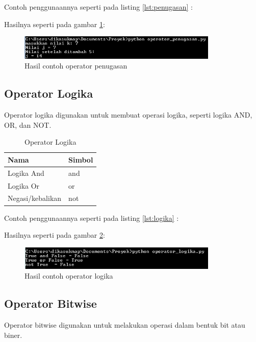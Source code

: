Contoh penggunaannya seperti pada listing \ref{lst:penugasan} :


Hasilnya seperti pada gambar \ref{fig:penugasan}:
\begin{figure}[!htbp]
	\centerline{\includegraphics[width=0.85\textwidth]{figures/2/penugasan.PNG}}
	\caption{Hasil contoh operator penugasan}
	\label{fig:penugasan}
\end{figure}

\subsection{Operator Logika}
Operator logika digunakan untuk membuat operasi logika, seperti logika AND, OR, dan NOT.

\begin{table}[]
\caption{Operator Logika}
\label{tab:my-table}
\begin{tabular}{|l|l|}
\hline
Nama             & Simbol \\ \hline
Logika And       & and    \\ \hline
Logika Or        & or     \\ \hline
Negasi/kebalikan & not    \\ \hline
\end{tabular}
\end{table}

Contoh penggunaannya seperti pada listing \ref{lst:logika} :


Hasilnya seperti pada gambar \ref{fig:logika}:
\begin{figure}[!htbp]
	\centerline{\includegraphics[width=0.85\textwidth]{figures/2/logika.PNG}}
	\caption{Hasil contoh operator logika}
	\label{fig:logika}
\end{figure}

\subsection{Operator Bitwise}
Operator bitwise digunakan untuk melakukan operasi dalam bentuk bit atau biner.


